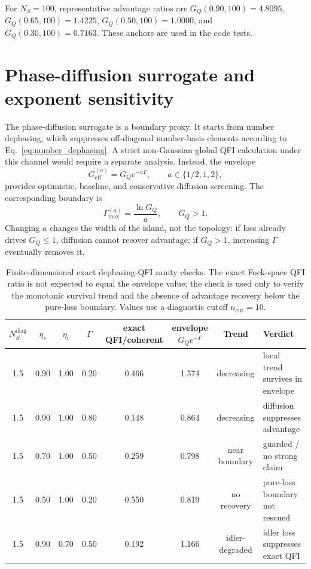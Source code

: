 \documentclass[a4paper,11pt]{article}
\numberwithin{equation}{section}
\newcommand{\Ns}{N_{S}}
\newcommand{\GQ}{G_Q}
\newcommand{\Geff}{G_{\mathrm{eff}}}
\begin{document}
For $\Ns=100$, representative advantage ratios are $\GQ(0.90,100)=4.8095$, $\GQ(0.65,100)=1.4225$, $\GQ(0.50,100)=1.0000$, and $\GQ(0.30,100)=0.7163$. These anchors are used in the code tests.

\section{Phase-diffusion surrogate and exponent sensitivity}
\label{app:diffusion}

The phase-diffusion surrogate is a boundary proxy. It starts from number dephasing, which suppresses off-diagonal number-basis elements according to Eq.~\eqref{eq:number_dephasing}. A strict non-Gaussian global QFI calculation under this channel would require a separate analysis. Instead, the envelope
\begin{equation}
  \Geff^{(a)}=\GQ e^{-a\Gamma},\qquad a\in\{1/2,1,2\},
\end{equation}
provides optimistic, baseline, and conservative diffusion screening. The corresponding boundary is
\begin{equation}
  \Gamma_{\max}^{(a)}=\frac{\ln\GQ}{a},\qquad \GQ>1.
\end{equation}
Changing $a$ changes the width of the island, not the topology: if loss already drives $\GQ\le1$, diffusion cannot recover advantage; if $\GQ>1$, increasing $\Gamma$ eventually removes it.

\begin{table}[htbp]
\centering
\caption{Finite-dimensional exact dephasing-QFI sanity checks. The exact Fock-space QFI ratio is not expected to equal the envelope value; the check is used only to verify the monotonic survival trend and the absence of advantage recovery below the pure-loss boundary. Values use a diagnostic cutoff $n_{\mathrm{cut}}=10$.}
\label{tab:dephasing_sanity}
\scriptsize
\begin{tabular}{cccccccl}
\toprule
$N_S^{\mathrm{diag}}$ & $\eta_s$ & $\eta_i$ & $\Gamma$ & exact QFI/coherent & envelope $G_Qe^{-\Gamma}$ & Trend & Verdict \\
\midrule
1.5 & 0.90 & 1.00 & 0.20 & 0.466 & 1.574 & decreasing & local trend survives in envelope \\
1.5 & 0.90 & 1.00 & 0.80 & 0.148 & 0.864 & decreasing & diffusion suppresses advantage \\
1.5 & 0.70 & 1.00 & 0.50 & 0.259 & 0.798 & near boundary & guarded / no strong claim \\
1.5 & 0.50 & 1.00 & 0.20 & 0.550 & 0.819 & no recovery & pure-loss boundary not rescued \\
1.5 & 0.90 & 0.70 & 0.50 & 0.192 & 1.166 & idler-degraded & idler loss suppresses exact QFI \\
\bottomrule
\end{tabular}
\end{table}
\end{document}
